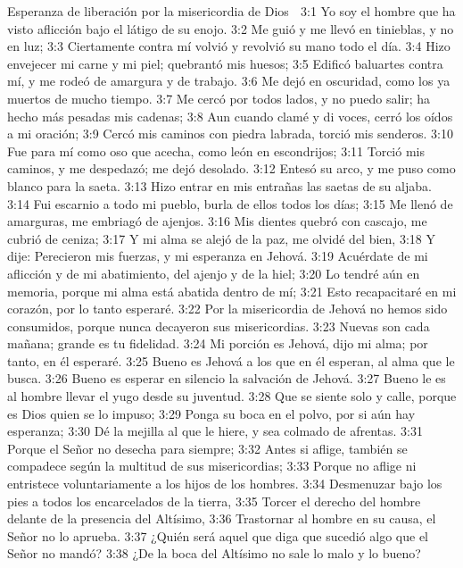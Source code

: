 Esperanza de liberación por la misericordia de Dios 

3:1 Yo soy el hombre que ha visto aflicción bajo el látigo de su enojo.  
3:2 Me guió y me llevó en tinieblas, y no en luz;  
3:3 Ciertamente contra mí volvió y revolvió su mano todo el día.  
3:4 Hizo envejecer mi carne y mi piel; quebrantó mis huesos;  
3:5 Edificó baluartes contra mí, y me rodeó de amargura y de trabajo.  
3:6 Me dejó en oscuridad, como los ya muertos de mucho tiempo.  
3:7 Me cercó por todos lados, y no puedo salir; ha hecho más pesadas mis cadenas;  
3:8 Aun cuando clamé y di voces, cerró los oídos a mi oración;  
3:9 Cercó mis caminos con piedra labrada, torció mis senderos.  
3:10 Fue para mí como oso que acecha, como león en escondrijos;  
3:11 Torció mis caminos, y me despedazó; me dejó desolado.  
3:12 Entesó su arco, y me puso como blanco para la saeta.  
3:13 Hizo entrar en mis entrañas las saetas de su aljaba.  
3:14 Fui escarnio a todo mi pueblo, burla de ellos todos los días;  
3:15 Me llenó de amarguras, me embriagó de ajenjos.  
3:16 Mis dientes quebró con cascajo, me cubrió de ceniza;  
3:17 Y mi alma se alejó de la paz, me olvidé del bien,  
3:18 Y dije: Perecieron mis fuerzas, y mi esperanza en Jehová.  
3:19 Acuérdate de mi aflicción y de mi abatimiento, del ajenjo y de la hiel;  
3:20 Lo tendré aún en memoria, porque mi alma está abatida dentro de mí;  
3:21 Esto recapacitaré en mi corazón, por lo tanto esperaré.  
3:22 Por la misericordia de Jehová no hemos sido consumidos, porque nunca decayeron sus misericordias. 
3:23 Nuevas son cada mañana; grande es tu fidelidad.  
3:24 Mi porción es Jehová, dijo mi alma; por tanto, en él esperaré.  
3:25 Bueno es Jehová a los que en él esperan, al alma que le busca.  
3:26 Bueno es esperar en silencio la salvación de Jehová.  
3:27 Bueno le es al hombre llevar el yugo desde su juventud.  
3:28 Que se siente solo y calle, porque es Dios quien se lo impuso;  
3:29 Ponga su boca en el polvo, por si aún hay esperanza;  
3:30 Dé la mejilla al que le hiere, y sea colmado de afrentas.  
3:31 Porque el Señor no desecha para siempre;  
3:32 Antes si aflige, también se compadece según la multitud de sus misericordias;  
3:33 Porque no aflige ni entristece voluntariamente a los hijos de los hombres.  
3:34 Desmenuzar bajo los pies a todos los encarcelados de la tierra,  
3:35 Torcer el derecho del hombre delante de la presencia del Altísimo,  
3:36 Trastornar al hombre en su causa, el Señor no lo aprueba.  
3:37 ¿Quién será aquel que diga que sucedió algo que el Señor no mandó?  
3:38 ¿De la boca del Altísimo no sale lo malo y lo bueno?  
